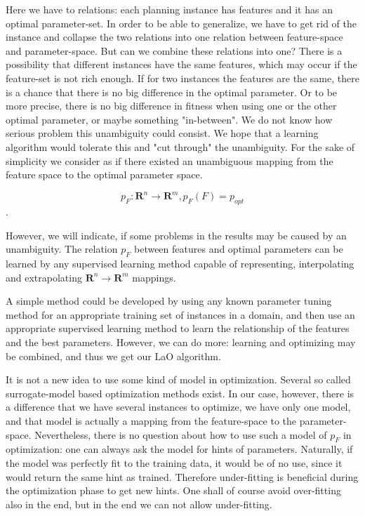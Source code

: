 \documentclass{MYsig-alternate}
\begin{document}
Here we have to relations: each planning instance has features and it has an optimal parameter-set. In order to be able to generalize, we have to get rid of the instance and collapse the two relations into one relation between feature-space and parameter-space. But can we combine these relations into one? There is a possibility that different instances have the same features, which may occur if the feature-set is not rich enough. If for two instances the features are the same, there is a chance that there is no big difference in the optimal parameter. Or to be more precise, there is no big difference in fitness when using one or the other optimal parameter, or maybe something "in-between". We do not know how serious problem this unambiguity could consist. We hope that a learning algorithm would tolerate this and "cut through" the unambiguity. For the sake of simplicity we consider as if there existed an unambiguous mapping from the feature space to the optimal parameter space. 

\begin{equation} p_F: \mathbf{R}^n \to \mathbf{R}^m, p_F(F)=p_{opt} \end{equation}.	

However, we will indicate, if some problems in the results may be caused by an unambiguity. The relation \begin{math} p_F \end{math} between features and optimal parameters can be learned by any supervised learning method capable of representing, interpolating and extrapolating  \begin{math}\mathbf{R}^n\to \mathbf{R}^m \end{math} mappings. 

A simple method could be developed by using any known parameter tuning method for an appropriate training set of instances in a domain, and then use an appropriate supervised learning method to learn the relationship of the features and the best parameters. However, we can do more: learning and optimizing may be combined, and thus we get our LaO algorithm.

It is not a new idea to use some kind of model in optimization. Several so called surrogate-model based optimization methods exist. In our case, however, there is a difference that we have several instances to optimize, we have only one model, and that model is actually a mapping from the feature-space to the parameter-space. Nevertheless, there is no question about how to use such a model of \begin{math}p_F\end{math} in optimization: one can always ask the model for hints of parameters. Naturally, if the model was perfectly fit to the training data, it would be of no use, since it would return the same hint as trained. Therefore under-fitting is beneficial during the optimization phase to get new hints. One shall of course avoid over-fitting also in the end, but in the end we can not allow under-fitting.
\end{document}

